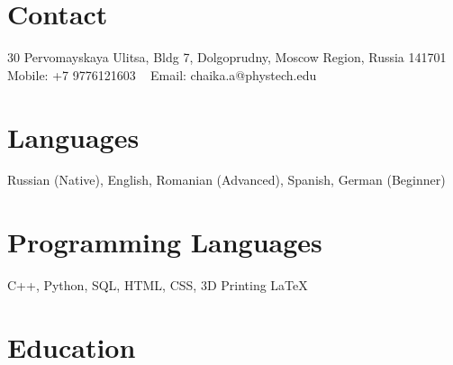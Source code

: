 \documentclass[]{cv-style}          %
\begin{document}


\begin{aside}
%
\section{Contact}
30 Pervomayskaya Ulitsa, Bldg 7, Dolgoprudny, Moscow Region, Russia 141701
~
Mobile:
+7 9776121603
~
Email:
chaika.a@phystech.edu
%
\section{Languages}
Russian (Native), English, Romanian (Advanced), Spanish, German (Beginner)
%
\section{Programming
   Languages}
C++, Python, SQL, HTML, CSS, 3D Printing
\LaTeX{}
%
\end{aside}


\section{Education}
\end{document}
